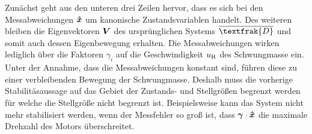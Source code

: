 Zunächst geht aus den unteren drei Zeilen hervor, dass es sich bei den Messabweichungen $\boldsymbol{\hat{x}}$ um kanonische Zustandsvariablen handelt. Des weiteren bleiben die Eigenvektoren $\boldsymbol{V}$ des ursprünglichen Systems $\overline{\textfrak{D}}$ und somit auch dessen Eigenbewegung erhalten. Die Messabweichungen wirken lediglich über die Faktoren $\gamma_i$ auf die Geschwindigkeit $u_{\text{R}}$ des Schwungmasse ein. Unter der Annahme, dass die Messabweichungen konstant sind, führen diese zu einer verbleibenden Bewegung der Schwungmasse. Deshalb muss die vorherige Stabilitäsaussage auf das Gebiet der Zustands- und Stellgrößen begrenzt werden für welche die Stellgröße nicht begrenzt ist. Beispielsweise kann das System nicht mehr stabilisiert werden, wenn der Messfehler so groß ist, dass $\boldsymbol{\gamma}\cdot \boldsymbol{\hat{x}}$ die maximale Drehzahl des Motors überschreitet.

